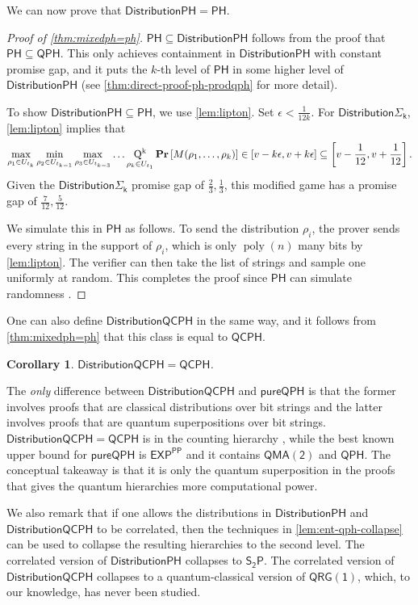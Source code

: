 \documentclass[10pt,a4paper]{article}
\newtheorem{corollary}[theorem]{Corollary}
\theoremstyle{definition}
\renewcommand{\Pr}{\mathop{\bf Pr\/}}
\DeclareMathOperator{\poly}{poly}
\newcommand{\class}[1]{\ensuremath{\mathsf{#1}}\xspace}
\newcommand{\EXP}{\class{EXP}}
\newcommand{\QMAk}[1][k]{\class{QMA(#1)}}
\newcommand{\QMAtwo}{\QMAk[2]}
\newcommand{\QRGk}[1][k]{\class{QRG(#1)}}
\newcommand{\QRGone}{\QRGk[1]}
\newcommand{\PP}{\class{PP}}
\newcommand{\PH}{\class{PH}}
\newcommand{\QCPH}{\class{QCPH}}
\newcommand{\QPH}{\class{QPH}}
\newcommand{\pureQPH}{\class{pureQPH}}
\newcommand{\StwoP}{\class{S_{2}P}}
\newcommand{\distributionPH}{\mixedPH}
\newcommand{\distributionQCPH}{\mathsf{DistributionQCPH}}
\newcommand{\mixedPH}{\class{DistributionPH}}
\newcommand{\mixedSigmai}[1][i]{\mathsf{Distribution\Sigma_{#1}}}
\begin{document}
We can now prove that $\mixedPH = \PH$. 

\begin{proof}[Proof of \cref{thm:mixedph=ph}]
    $\PH \subseteq \mixedPH$ follows from the proof that $\PH\subseteq \QPH$.
    This only achieves containment in $\mixedPH$ with constant promise gap, and it puts the $k$-th level of $\PH$ in some higher level of $\mixedPH$ (see \cref{thm:direct-proof-ph-prodqph} for more detail).
    
    To show $\mixedPH \subseteq \PH$, we use \cref{lem:lipton}.
    Set $\epsilon < \frac{1}{12k}$.
    For $\mixedSigmai[k]$, \cref{lem:lipton} implies that
    \[
        \max_{\rho_1\in U_{t_k}} \min_{\rho_2\in U_{t_{k-1}}} \max_{\rho_3 \in U_{t_{k-3}}} \dots \operatorname*{Q^k}_{\rho_k \in U_{t_1}} \Pr\left[M(\rho_1,\dots,\rho_k)\right] \in [v - k\epsilon, v+k\epsilon] \subseteq \left[v-\frac{1}{12} , v+\frac{1}{12}\right].
    \]
    Given the $\mixedSigmai[k]$ promise gap of $\frac{2}{3},\frac{1}{3}$, this modified game has a promise gap of $\frac{7}{12},\frac{5}{12}$.
    
    We simulate this in $\PH$ as follows. To send the distribution $\rho_i$, the prover sends every string in the support of $\rho_i$, which is only $\poly(n)$ many bits by \cref{lem:lipton}. The verifier can then take the list of strings and sample one uniformly at random. 
    This completes the proof since $\PH$ can simulate randomness \cite{sipser1983complexity, LAUTEMANN1983215}. 
\end{proof}


One can also define $\distributionQCPH$ in the same way, and it follows from \cref{thm:mixedph=ph} that this class is equal to $\QCPH$. 
\begin{corollary}\label{cor:distqcph=qcph}
    $\distributionQCPH = \QCPH$.
\end{corollary}

The \emph{only} difference between $\distributionQCPH$ and $\pureQPH$ is that the former involves proofs that are classical distributions over bit strings and the latter involves proofs that are quantum superpositions over bit strings.
$\distributionQCPH = \QCPH$  is in the counting hierarchy \cite{GSSSY22_qph}, while the best known upper bound for $\pureQPH$ is $\EXP^\PP$ \cite{agarwal2023quantum} and it contains $\QMAtwo$ and $\QPH$.
The conceptual takeaway is that it is only the quantum superposition in the proofs that gives the quantum hierarchies more computational power. 

We also remark that if one allows the distributions in $\distributionPH$ and $\distributionQCPH$ to be correlated, then the techniques in \cref{lem:ent-qph-collapse} can be used to collapse the resulting hierarchies to the second level. The correlated version of $\distributionPH$ collapses to $\StwoP$. 
The correlated version of $\distributionQCPH$ collapses to a quantum-classical version of $\QRGone$, which, to our knowledge, has never been studied. 
\end{document}
